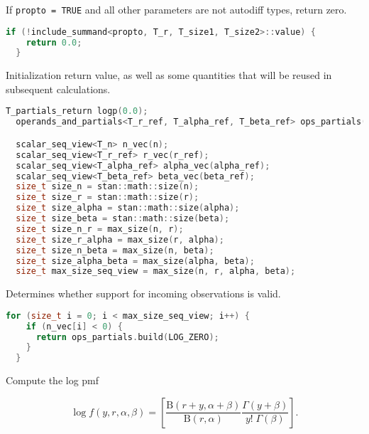 \documentclass[11pt]{article}
\begin{document}
If \verb|propto = TRUE| and all other parameters are not autodiff types, return zero.
\begin{lstlisting}[language=c++, style=lgeneral]
  if (!include_summand<propto, T_r, T_size1, T_size2>::value) {
    return 0.0;
  }
\end{lstlisting}


Initialization return value, as well as some quantities that will be reused in subsequent calculations.
\begin{lstlisting}[language=c++, style=lgeneral]
  T_partials_return logp(0.0);
  operands_and_partials<T_r_ref, T_alpha_ref, T_beta_ref> ops_partials(r_ref, alpha_ref, beta_ref);

  scalar_seq_view<T_n> n_vec(n);
  scalar_seq_view<T_r_ref> r_vec(r_ref);
  scalar_seq_view<T_alpha_ref> alpha_vec(alpha_ref);
  scalar_seq_view<T_beta_ref> beta_vec(beta_ref);
  size_t size_n = stan::math::size(n);
  size_t size_r = stan::math::size(r);
  size_t size_alpha = stan::math::size(alpha);
  size_t size_beta = stan::math::size(beta);
  size_t size_n_r = max_size(n, r);
  size_t size_r_alpha = max_size(r, alpha);
  size_t size_n_beta = max_size(n, beta);
  size_t size_alpha_beta = max_size(alpha, beta);
  size_t max_size_seq_view = max_size(n, r, alpha, beta);
\end{lstlisting}


Determines whether support for incoming observations is valid.
\begin{lstlisting}[language=c++, style=lgeneral]
  for (size_t i = 0; i < max_size_seq_view; i++) {
    if (n_vec[i] < 0) {
      return ops_partials.build(LOG_ZERO);
    }
  }
\end{lstlisting}

Compute the log pmf

\begin{equation}
  \log f(y, r, \alpha ,\beta)= \left[ \frac {\mathrm {B} (r+y,\alpha +\beta )}{\mathrm {B} (r,\alpha )} \frac {\Gamma (y+\beta )}{y!\;\Gamma (\beta )} \right].
\end{equation}
\end{document}
